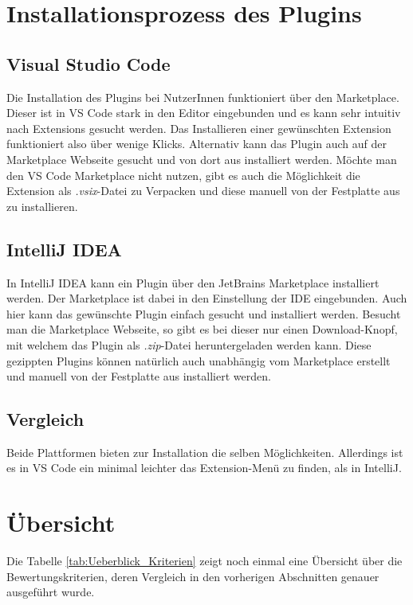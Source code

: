 \section{Installationsprozess des Plugins}
\label{sec:Vergleich_Installationsprozess}

\subsection{Visual Studio Code}

Die Installation des Plugins bei NutzerInnen funktioniert
über den Marketplace. Dieser ist in VS Code stark in den 
Editor eingebunden und es kann sehr intuitiv nach 
Extensions gesucht werden. Das Installieren einer gewünschten
Extension funktioniert also über wenige Klicks.
Alternativ kann das Plugin auch auf der Marketplace Webseite
gesucht und von dort aus installiert werden.
Möchte man den VS Code Marketplace nicht nutzen, gibt es auch
die Möglichkeit die Extension als \emph{.vsix}-Datei
zu Verpacken und diese manuell von der Festplatte aus zu installieren.

\subsection{IntelliJ IDEA}

In IntelliJ IDEA kann ein Plugin über den JetBrains Marketplace
installiert werden. Der Marketplace ist dabei in den Einstellung
der IDE eingebunden. Auch hier kann das gewünschte Plugin einfach
gesucht und installiert werden.
Besucht man die Marketplace Webseite, so gibt es bei dieser nur einen
Download-Knopf, mit welchem das Plugin als \emph{.zip}-Datei heruntergeladen
werden kann. Diese gezippten Plugins können natürlich auch
unabhängig vom Marketplace erstellt und manuell
von der Festplatte aus installiert werden.

\subsection{Vergleich}

Beide Plattformen bieten zur Installation die selben Möglichkeiten.
Allerdings ist es in VS Code ein minimal leichter das Extension-Menü
zu finden, als in IntelliJ.


\section{Übersicht}

Die Tabelle \ref{tab:Ueberblick_Kriterien} zeigt noch
einmal eine Übersicht über die Bewertungskriterien,
deren Vergleich in den vorherigen Abschnitten genauer
ausgeführt wurde.

